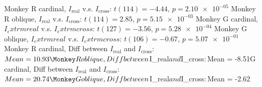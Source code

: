 Monkey R cardinal, $I_\textrm{real}$ v.s. $I_\textrm{cross}$: $t(114) = -4.44$, $p = \num{2.10e-05}$ 
Monkey R oblique, $I_\textrm{real}$ v.s. $I_\textrm{cross}$: $t(114) = 2.85$, $p = \num{5.15e-03}$ 
Monkey G cardinal, $I_	extrm{real}$ v.s. $I_	extrm{cross}$: $t(127) = -3.56$, $p = \num{5.28e-04}$ 
Monkey G oblique, $I_	extrm{real}$ v.s. $I_	extrm{cross}$: $t(106) = -0.67$, $p = \num{5.07e-01}$ 
Monkey R cardinal, Diff between $I_\textrm{real}$ and $I_\textrm{cross}$: $Mean = 10.93\Monkey R oblique, Diff between $I_\textrm{real}$ and $I_\textrm{cross}$: $Mean = -8.51\Monkey G cardinal, Diff between $I_\textrm{real}$ and $I_\textrm{cross}$: $Mean = 20.74\Monkey G oblique, Diff between $I_\textrm{real}$ and $I_\textrm{cross}$: $Mean = -2.62\